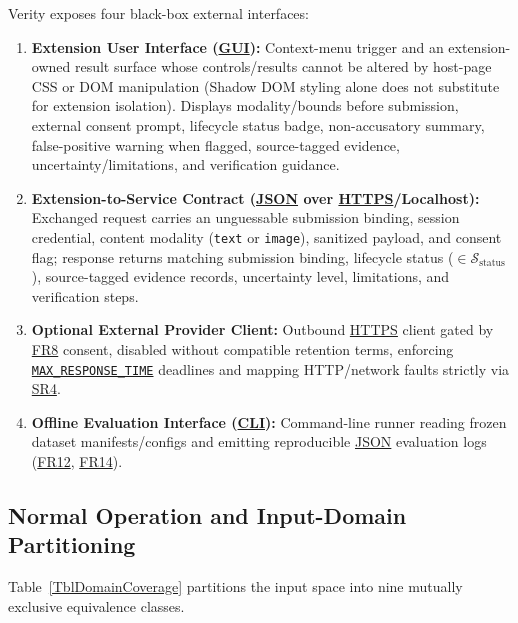 \documentclass[11pt]{article}
\newcommand{\MaxResponseTime}{\hyperref[const:MAX_RESPONSE_TIME]{\texttt{MAX\_\allowbreak{}RESPONSE\_\allowbreak{}TIME}}}
\newcommand{\CLI}{\hyperlink{acr-cli}{CLI}}
\newcommand{\HTTPS}{\hyperlink{acr-https}{HTTPS}}
\newcommand{\JSON}{\hyperlink{acr-json}{JSON}}
\newcommand{\GUI}{\hyperlink{acr-gui}{GUI}}
\begin{document}
Verity exposes four black-box external interfaces:
\begin{enumerate}[leftmargin=*, itemsep=2pt]
    \item \textbf{Extension User Interface (\GUI{}):} Context-menu trigger and an extension-owned result surface whose controls/results cannot be altered by host-page CSS or DOM manipulation (Shadow DOM styling alone does not substitute for extension isolation). Displays modality/bounds before submission, external consent prompt, lifecycle status badge, non-accusatory summary, false-positive warning when flagged, source-tagged evidence, uncertainty/limitations, and verification guidance.
    \item \textbf{Extension-to-Service Contract (\JSON{} over \HTTPS{}/Localhost):} Exchanged request carries an unguessable submission binding, session credential, content modality (\texttt{text} or \texttt{image}), sanitized payload, and consent flag; response returns matching submission binding, lifecycle status ($\in \mathcal{S}_{\text{status}}$), source-tagged evidence records, uncertainty level, limitations, and verification steps.
    \item \textbf{Optional External Provider Client:} Outbound \HTTPS{} client gated by \hyperref[FR8]{FR8} consent, disabled without compatible retention terms, enforcing \MaxResponseTime{} deadlines and mapping HTTP/network faults strictly via \hyperref[SR4]{SR4}.
    \item \textbf{Offline Evaluation Interface (\CLI{}):} Command-line runner reading frozen dataset manifests/configs and emitting reproducible \JSON{} evaluation logs (\hyperref[FR12]{FR12}, \hyperref[FR14]{FR14}).
\end{enumerate}

\subsection{Normal Operation and Input-Domain Partitioning}\label{subsec:normal-operation}

Table~\ref{TblDomainCoverage} partitions the input space into nine mutually exclusive equivalence classes.
\end{document}
